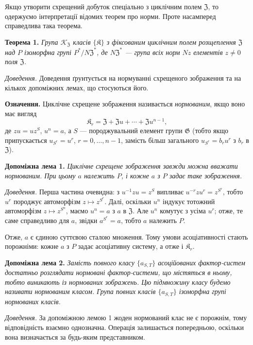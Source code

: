 \documentclass[11pt]{article}
\begin{document}
Якщо утворити схрещений добуток спеціально з циклічним полем \(\mathfrak Z\), то одержуємо інтерпретації відомих теорем про норми. Проте насамперед справедлива така теорема.

\noindent\textbf{Теорема 1.} \emph{Група \(\mathscr K_{\mathfrak Z}\) класів \(\{\mathfrak K\}\) з фіксованим циклічним полем розщеплення \(\mathfrak Z\) над \(P\) ізоморфна групі \(P^*/N\mathfrak Z^*\), де \(N\mathfrak Z^*\) --- група всіх норм \(Nz\) елементів \(z\neq0\) поля \(\mathfrak Z\).}

\noindent\emph{Доведення.} Доведення ґрунтується на нормуванні схрещеного зображення та на кількох допоміжних лемах, що стосуються його.

\noindent\textbf{Означення.} Циклічне схрещене зображення називається \emph{нормованим}, якщо воно має вигляд
\[
\mathfrak K_r=\mathfrak Z+\mathfrak Zu+\cdots+\mathfrak Zu^{n-1},
\]
де \(zu=uz^S\), \(u^n=a\), а \(S\) --- породжувальний елемент групи \(\mathfrak G\) (тобто якщо припускається \(u_{S^r}=u^r\), \(r=0,\ldots,n-1\), замість більш загального \(u_{S^r}=b_ru^r\) з \(b_r\) в \(\mathfrak Z\)).

\noindent\textbf{Допоміжна лема 1.} \emph{Циклічне схрещене зображення завжди можна вважати нормованим. При цьому \(a\) належить \(P\), і кожне \(a\) з \(P\) задає таке зображення.}

\noindent\emph{Доведення.} Перша частина очевидна: з \(u^{-1}zu=z^S\) випливає \(u^{-r}zu^r=z^{S^r}\), тобто \(u^r\) породжує автоморфізм \(z\mapsto z^{S^r}\). Далі, оскільки \(u^n\) індукує тотожний автоморфізм \(z\mapsto z^{S^n}\), маємо \(u^n=a\) з \(a\) в \(\mathfrak Z\). Але \(u^n\) комутує з усіма \(u^r\); отже, те саме справедливо для \(a\), звідки \(a^{S^r}=a\), тобто \(a\) належить \(P\).

Отже, \(a\) є єдиною суттєвою сталою множення. Тому умови асоціативності стають порожніми: кожне \(a\) з \(P\) задає асоціативну систему, а отже і \(\mathfrak K_r\).

\noindent\textbf{Допоміжна лема 2.} \emph{Замість повного класу \(\{a_{S,T}\}\) асоційованих фактор-систем достатньо розглядати нормовані фактор-системи, що містяться в ньому, тобто виникають із нормованих зображень. Цю підмножину класу будемо називати нормованим класом. Група повних класів \(\{a_{S,T}\}\) ізоморфна групі нормованих класів.}

\noindent\emph{Доведення.} За допоміжною лемою 1 жоден нормований клас не є порожнім, тому відповідність взаємно однозначна. Операція залишається попередньою, оскільки вона визначається за будь-яким представником.
\end{document}
